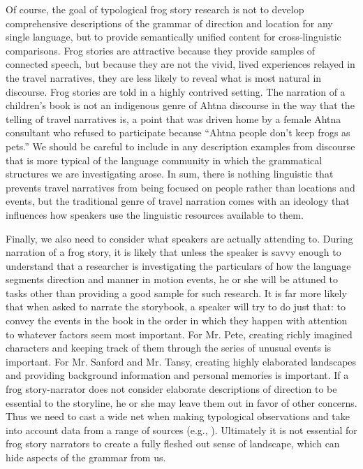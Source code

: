 Of course, the goal of typological frog story research is not to develop comprehensive descriptions of the grammar of direction and location for any single language, but to provide semantically unified content for cross-linguistic comparisons. Frog stories are attractive because they provide samples of connected speech, but because they are not the vivid, lived experiences relayed in the travel narratives, they are less likely to reveal what is most natural in discourse. Frog stories are told in a highly contrived setting. The narration of a children’s book is not an indigenous genre of Ahtna discourse in the way that the telling of travel narratives is, a point that was driven home by a female Ahtna consultant who refused to participate because “Ahtna people don’t keep frogs as pets.” We should be careful to include in any description examples from discourse that is more typical of the language community in which the grammatical structures we are investigating arose. In sum, there is nothing linguistic that prevents travel narratives from being focused on people rather than locations and events, but the traditional genre of travel narration comes with an ideology that influences how speakers use the linguistic resources available to them.

Finally, we also need to consider what speakers are actually attending to. During narration of a frog story, it is likely that unless the speaker is savvy enough to understand that a researcher is investigating the particulars of how the language segments direction and manner in motion events, he or she will be attuned to tasks other than providing a good sample for such research. It is far more likely that when asked to narrate the storybook, a speaker will try to do just that: to convey the events in the book in the order in which they happen with attention to whatever factors seem most important. For Mr. Pete, creating richly imagined characters and keeping track of them through the series of unusual events is important. For Mr. Sanford and Mr. Tansy, creating highly elaborated landscapes and providing background information and personal memories is important. If a frog story-narrator does not consider elaborate descriptions of direction to be essential to the storyline, he or she may leave them out in favor of other concerns. Thus we need to cast a wide net when making typological observations and take into account data from a range of sources (e.g., \citealt{ApplebaumBerez2009}). Ultimately it is not essential for frog story narrators to create a fully fleshed out sense of landscape, which can hide aspects of the grammar from us. \\

